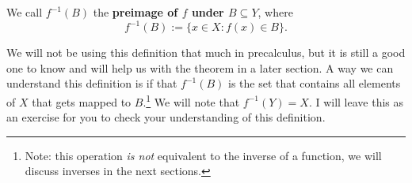 \begin{define}
	We call $f^{-1}(B)$ the \textbf{preimage of $f$ under $B\subseteq Y$}, where
	$$f^{-1}(B):=\{x\in X : f(x)\in B\}.$$
\end{define}

We will not be using this definition that much in precalculus, but it is still a good one to know and will help us with the theorem in a later section.
A way we can understand this definition is if that $f^{-1}(B)$ is the set that contains all elements of $X$ that gets mapped to $B$.\footnote{Note: this operation \textit{is not} equivalent to the inverse of a function, we will discuss inverses in the next sections.}
We will note that $f^{-1}(Y)=X$. I will leave this as an exercise for you to check your understanding of this definition.

\begin{figure}[h]
\centering
{}
	\caption{}
	\label{fig:preimage}
\end{figure}


